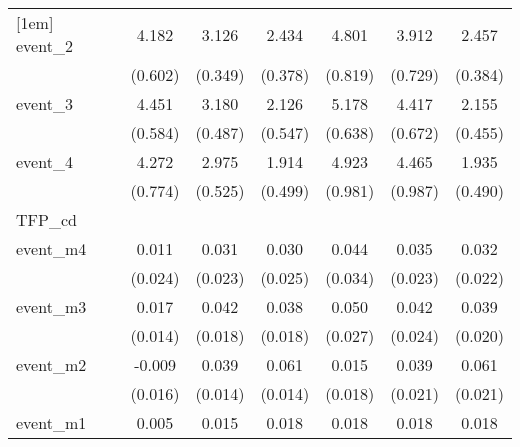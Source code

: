 {\begin{tabular}{l*{6}{c}}
[1em]
event\_2     &       4.182\sym{***}&       3.126\sym{***}&       2.434\sym{***}&       4.801\sym{***}&       3.912\sym{***}&       2.457\sym{***}\\
            &     (0.602)         &     (0.349)         &     (0.378)         &     (0.819)         &     (0.729)         &     (0.384)         \\
[1em]
event\_3     &       4.451\sym{***}&       3.180\sym{***}&       2.126\sym{***}&       5.178\sym{***}&       4.417\sym{***}&       2.155\sym{***}\\
            &     (0.584)         &     (0.487)         &     (0.547)         &     (0.638)         &     (0.672)         &     (0.455)         \\
[1em]
event\_4     &       4.272\sym{***}&       2.975\sym{***}&       1.914\sym{***}&       4.923\sym{***}&       4.465\sym{***}&       1.935\sym{***}\\
            &     (0.774)         &     (0.525)         &     (0.499)         &     (0.981)         &     (0.987)         &     (0.490)         \\
\hline
TFP\_cd      &                     &                     &                     &                     &                     &                     \\
event\_m4    &       0.011         &       0.031         &       0.030         &       0.044         &       0.035         &       0.032         \\
            &     (0.024)         &     (0.023)         &     (0.025)         &     (0.034)         &     (0.023)         &     (0.022)         \\
[1em]
event\_m3    &       0.017         &       0.042\sym{*}  &       0.038\sym{*}  &       0.050         &       0.042         &       0.039         \\
            &     (0.014)         &     (0.018)         &     (0.018)         &     (0.027)         &     (0.024)         &     (0.020)         \\
[1em]
event\_m2    &      -0.009         &       0.039\sym{**} &       0.061\sym{***}&       0.015         &       0.039         &       0.061\sym{**} \\
            &     (0.016)         &     (0.014)         &     (0.014)         &     (0.018)         &     (0.021)         &     (0.021)         \\
[1em]
event\_m1    &       0.005         &       0.015         &       0.018         &       0.018         &       0.018         &       0.018         \\

\end{tabular}}
